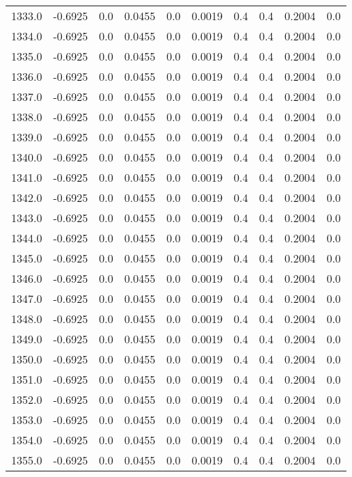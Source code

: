 \begin{longtable}{lrrrrrrrrr}
1333.0 & -0.6925 & 0.0 & 0.0455 & 0.0 & 0.0019 & 0.4 & 0.4 & 0.2004 & 0.0 \\
1334.0 & -0.6925 & 0.0 & 0.0455 & 0.0 & 0.0019 & 0.4 & 0.4 & 0.2004 & 0.0 \\
1335.0 & -0.6925 & 0.0 & 0.0455 & 0.0 & 0.0019 & 0.4 & 0.4 & 0.2004 & 0.0 \\
1336.0 & -0.6925 & 0.0 & 0.0455 & 0.0 & 0.0019 & 0.4 & 0.4 & 0.2004 & 0.0 \\
1337.0 & -0.6925 & 0.0 & 0.0455 & 0.0 & 0.0019 & 0.4 & 0.4 & 0.2004 & 0.0 \\
1338.0 & -0.6925 & 0.0 & 0.0455 & 0.0 & 0.0019 & 0.4 & 0.4 & 0.2004 & 0.0 \\
1339.0 & -0.6925 & 0.0 & 0.0455 & 0.0 & 0.0019 & 0.4 & 0.4 & 0.2004 & 0.0 \\
1340.0 & -0.6925 & 0.0 & 0.0455 & 0.0 & 0.0019 & 0.4 & 0.4 & 0.2004 & 0.0 \\
1341.0 & -0.6925 & 0.0 & 0.0455 & 0.0 & 0.0019 & 0.4 & 0.4 & 0.2004 & 0.0 \\
1342.0 & -0.6925 & 0.0 & 0.0455 & 0.0 & 0.0019 & 0.4 & 0.4 & 0.2004 & 0.0 \\
1343.0 & -0.6925 & 0.0 & 0.0455 & 0.0 & 0.0019 & 0.4 & 0.4 & 0.2004 & 0.0 \\
1344.0 & -0.6925 & 0.0 & 0.0455 & 0.0 & 0.0019 & 0.4 & 0.4 & 0.2004 & 0.0 \\
1345.0 & -0.6925 & 0.0 & 0.0455 & 0.0 & 0.0019 & 0.4 & 0.4 & 0.2004 & 0.0 \\
1346.0 & -0.6925 & 0.0 & 0.0455 & 0.0 & 0.0019 & 0.4 & 0.4 & 0.2004 & 0.0 \\
1347.0 & -0.6925 & 0.0 & 0.0455 & 0.0 & 0.0019 & 0.4 & 0.4 & 0.2004 & 0.0 \\
1348.0 & -0.6925 & 0.0 & 0.0455 & 0.0 & 0.0019 & 0.4 & 0.4 & 0.2004 & 0.0 \\
1349.0 & -0.6925 & 0.0 & 0.0455 & 0.0 & 0.0019 & 0.4 & 0.4 & 0.2004 & 0.0 \\
1350.0 & -0.6925 & 0.0 & 0.0455 & 0.0 & 0.0019 & 0.4 & 0.4 & 0.2004 & 0.0 \\
1351.0 & -0.6925 & 0.0 & 0.0455 & 0.0 & 0.0019 & 0.4 & 0.4 & 0.2004 & 0.0 \\
1352.0 & -0.6925 & 0.0 & 0.0455 & 0.0 & 0.0019 & 0.4 & 0.4 & 0.2004 & 0.0 \\
1353.0 & -0.6925 & 0.0 & 0.0455 & 0.0 & 0.0019 & 0.4 & 0.4 & 0.2004 & 0.0 \\
1354.0 & -0.6925 & 0.0 & 0.0455 & 0.0 & 0.0019 & 0.4 & 0.4 & 0.2004 & 0.0 \\
1355.0 & -0.6925 & 0.0 & 0.0455 & 0.0 & 0.0019 & 0.4 & 0.4 & 0.2004 & 0.0 \\

\end{longtable}
